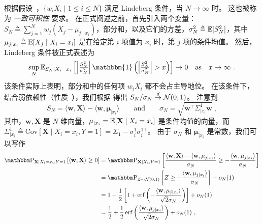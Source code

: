 根据假设~，$\{ w_i X_i \mid 1 \leq i \leq N \}$ 满足 Lindeberg 条件，当 $N \to \infty$ 时。
这也被称为 \emph{一致可积性} 要求。
在正式阐述之前，首先引入两个变量：$S_N \triangleq \sum_{j=1}^{N} w_j (X_j - \mu_{j\mid x_i})$，部分和，以及它们的方差，$\sigma_N^2 \triangleq \operatorname{\mathbb{E}}[ S_N^2 ]$，其中 $\mu_{j \mid x_i} \triangleq \operatorname{\mathbb{E}}[X_j \mid X_i = x_i]$ 是在给定第 $i$ 项值为 $x_i$ 时，第 $j$ 项的条件均值。
然后，Lindeberg 条件被正式表述为
\begin{equation*}
  \sup_N \E_{S_N \mid X_i = x_i} \left[ \left| \tfrac{S_N^2}{\sigma_N^2} \right| \mathbbm{1} \left( \left| \tfrac{S_N^2}{\sigma_N^2} \right| > x \right) \right] \to 0 \quad \text{as} \quad x\to\infty~.
\end{equation*}
该条件实际上表明，部分和中的任何项 $w_i X_i$ 都不会占主导地位。
在该条件下，结合弱依赖性（性质~），我们根据 \cite[定理 1.19, 10.2]{bradley2007introduction} 得出 $S_N / \sigma_N \overset{d}{\to} \operatorname{\mathcal{N}}(0,1)$。
注意到
\begin{equation*}
    S_N = \langle \mathbf{w}, \mathbf{X} \rangle - \langle \mathbf{w}, \mathbf{\mu}_{\mid x_i} \rangle \qquad  \text{and} \qquad \sigma_N = \sqrt{\mathbf{w}^\top \Sigma_{\mid x_i}^{1} \mathbf{w}}~,
\end{equation*}
其中，$\mathbf{w}, \mathbf{X}$ 是 $N$ 维向量，$\mathbf{\mu}_{\mid x_i} = \operatorname{\mathbb{E}}[\mathbf{X} \mid X_i = x_i]$ 是条件均值的向量，而 $\Sigma_{\mid x_i}^{1} \triangleq \text{Cov}[\mathbf{X} \mid X_i = x_i, Y = 1] = \Sigma_1 - \sigma_i^1 \sigma_i^{1\top}$。
由于 $\sigma_N$ 和 $\mathbf{\mu}_{\mid x_i}$ 是常数，我们可以写作
\begin{align*}
    \PR_{\mathbf{X} \mid X_i = x_i, Y = 1} \left[  \langle \mathbf{w}, \mathbf{X} \rangle \geq 0 \right]
    &= \PR_{\mathbf{X} \mid X_i, Y = 1} \left[ \frac{ \langle \mathbf{w}, \mathbf{X} \rangle - \langle \mathbf{w}, \mathbf{\mu}_{j \mid x_i} \rangle }{ \sigma_N } \geq -\frac{\langle \mathbf{w}, \mathbf{\mu}_{j \mid x_i} \rangle }{ \sigma_N } \right] \\
    &= \PR_{Z \sim \NN(0,1)} \left[ Z \geq -\frac{\langle \mathbf{w}, \mathbf{\mu}_{j \mid x_i} \rangle }{ \sigma_N } \right] + o_N(1) \\
    &= 1 - \frac{1}{2} \left[ 1 + \operatorname{erf}\left( -\frac{\langle \mathbf{w}, \mathbf{\mu}_{j \mid x_i} \rangle }{ \sqrt{2} \sigma_N } \right) \right] + o_N(1) \\
    &= \frac{1}{2} + \frac{1}{2} \operatorname{erf}\left(\frac{\langle \mathbf{w}, \mathbf{\mu}_{j \mid x_i} \rangle }{ \sqrt{2} \sigma_N } \right) + o_N(1)~,
\end{align*}
